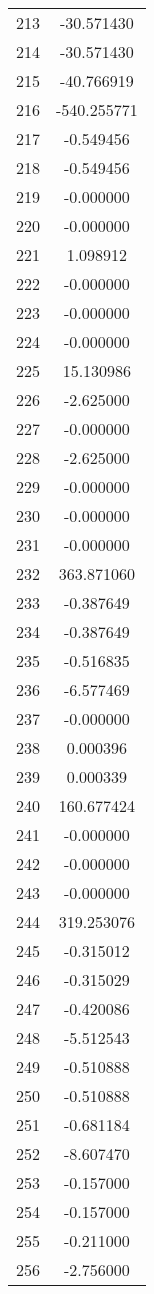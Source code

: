 \documentclass[12pt]{article}
\begin{document}
\begin{longtable}{@{}cc@{}}
213 & -30.571430 \\
214 & -30.571430 \\
215 & -40.766919 \\
216 & -540.255771 \\
217 & -0.549456 \\
218 & -0.549456 \\
219 & -0.000000 \\
220 & -0.000000 \\
221 & 1.098912 \\
222 & -0.000000 \\
223 & -0.000000 \\
224 & -0.000000 \\
225 & 15.130986 \\
226 & -2.625000 \\
227 & -0.000000 \\
228 & -2.625000 \\
229 & -0.000000 \\
230 & -0.000000 \\
231 & -0.000000 \\
232 & 363.871060 \\
233 & -0.387649 \\
234 & -0.387649 \\
235 & -0.516835 \\
236 & -6.577469 \\
237 & -0.000000 \\
238 & 0.000396 \\
239 & 0.000339 \\
240 & 160.677424 \\
241 & -0.000000 \\
242 & -0.000000 \\
243 & -0.000000 \\
244 & 319.253076 \\
245 & -0.315012 \\
246 & -0.315029 \\
247 & -0.420086 \\
248 & -5.512543 \\
249 & -0.510888 \\
250 & -0.510888 \\
251 & -0.681184 \\
252 & -8.607470 \\
253 & -0.157000 \\
254 & -0.157000 \\
255 & -0.211000 \\
256 & -2.756000 \\

\end{longtable}
\end{document}
